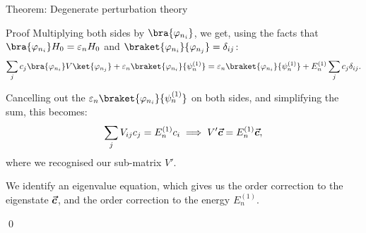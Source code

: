 \documentclass[a4paper]{article}
\begin{document}
\begin{parag}{Theorem: Degenerate perturbation theory}
\begin{subparag}{Proof}
        Multiplying both sides by $\bra{\phi_{n_i}}$, we get, using the facts that $\bra{\phi_{n_i}} H_0 = \epsilon_n H_0$ and $\braket{\phi_{n_i}}{\phi_{n_j}} = \delta_{ij}$: 
        \[\sum_{j} c_j \bra{\phi_{n_i}} V \ket{\phi_{n_j}} + \epsilon_n \braket{\phi_{n_i}}{\psi_n^{\left(1\right)}} = \epsilon_n \braket{\phi_{n_i}}{\psi_n^{\left(1\right)}} + E_n^{\left(1\right)} \sum_{j} c_j \delta_{ij}.\]

        Cancelling out the $\epsilon_n \braket{\phi_{n_i}}{\psi_n^{\left(1\right)}}$ on both sides, and simplifying the sum, this becomes:
        \[\sum_{j} V_{ij} c_j = E_n^{\left(1\right)} c_i \implies V' \bvec{c} = E_n^{\left(1\right)} \bvec{c},\]
        where we recognised our sub-matrix $V'$.
         
        We identify an eigenvalue equation, which gives us the  order correction to the eigenstate $\bm{\protect\vec{c}}$, and the  order correction to the energy $E_n^{\left(1\right)}$. 

        \qed
    \end{subparag}
\end{parag}
\end{document}
